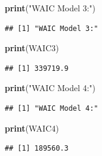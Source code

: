 \documentclass[
]{article}
\newenvironment{Shaded}{\begin{snugshade}}{\end{snugshade}}
\newcommand{\FunctionTok}[1]{\textcolor[rgb]{0.13,0.29,0.53}{\textbf{#1}}}
\newcommand{\NormalTok}[1]{#1}
\newcommand{\StringTok}[1]{\textcolor[rgb]{0.31,0.60,0.02}{#1}}
\begin{document}
\begin{Shaded}
\begin{Highlighting}[]
\FunctionTok{print}\NormalTok{(}\StringTok{"WAIC Model 3:"}\NormalTok{)}
\end{Highlighting}
\end{Shaded}

\begin{verbatim}
## [1] "WAIC Model 3:"
\end{verbatim}

\begin{Shaded}
\begin{Highlighting}[]
\FunctionTok{print}\NormalTok{(WAIC3)}
\end{Highlighting}
\end{Shaded}

\begin{verbatim}
## [1] 339719.9
\end{verbatim}

\begin{Shaded}
\begin{Highlighting}[]
\FunctionTok{print}\NormalTok{(}\StringTok{"WAIC Model 4:"}\NormalTok{)}
\end{Highlighting}
\end{Shaded}

\begin{verbatim}
## [1] "WAIC Model 4:"
\end{verbatim}

\begin{Shaded}
\begin{Highlighting}[]
\FunctionTok{print}\NormalTok{(WAIC4)}
\end{Highlighting}
\end{Shaded}

\begin{verbatim}
## [1] 189560.3
\end{verbatim}
\end{document}
